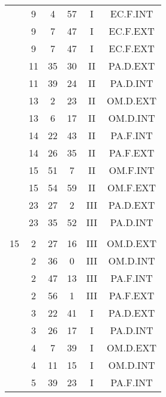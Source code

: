 \documentclass[12pt, a4paper]{article}
\begin{document}
\begin{multicols}{3}
{\begin{tabular}{c c c c c c}
	 	 	 	 & 9 & 4 & 57 & I & EC.F.INT\\%
	 	 	 	 & 9 & 7 & 47 & I & EC.F.EXT\\%
	 	 	 	 & 9 & 7 & 47 & I & EC.F.EXT\\%
	 	 	 	 & 11 & 35 & 30 & II & PA.D.EXT\\%
	 	 	 	 & 11 & 39 & 24 & II & PA.D.INT\\%
	 	 	 	 & 13 & 2 & 23 & II & OM.D.EXT\\%
	 	 	 	 & 13 & 6 & 17 & II & OM.D.INT\\%
	 	 	 	 & 14 & 22 & 43 & II & PA.F.INT\\%
	 	 	 	 & 14 & 26 & 35 & II & PA.F.EXT\\%
	 	 	 	 & 15 & 51 & 7 & II & OM.F.INT\\%
	 	 	 	 & 15 & 54 & 59 & II & OM.F.EXT\\%
	 	 	 	 & 23 & 27 & 2 & III & PA.D.EXT\\%
	 	 	 	 & 23 & 35 & 52 & III & PA.D.INT\\%
	 	 	 	 & & & & & \\%
	 	 	 	15 & 2 & 27 & 16 & III & OM.D.EXT\\%
	 	 	 	 & 2 & 36 & 0 & III & OM.D.INT\\%
	 	 	 	 & 2 & 47 & 13 & III & PA.F.INT\\%
	 	 	 	 & 2 & 56 & 1 & III & PA.F.EXT\\%
	 	 	 	 & 3 & 22 & 41 & I & PA.D.EXT\\%
	 	 	 	 & 3 & 26 & 17 & I & PA.D.INT\\%
	 	 	 	 & 4 & 7 & 39 & I & OM.D.EXT\\%
	 	 	 	 & 4 & 11 & 15 & I & OM.D.INT\\%
	 	 	 	 & 5 & 39 & 23 & I & PA.F.INT\\%

\end{tabular}}
\end{multicols}
\end{document}
